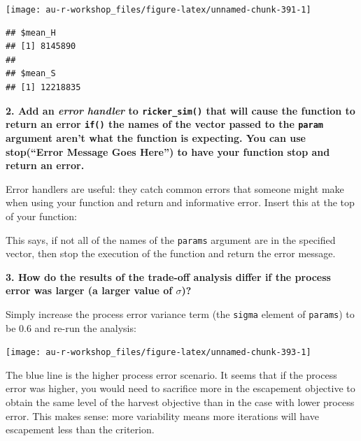\documentclass[]{book}
\newenvironment{Shaded}{\begin{snugshade}}{\end{snugshade}}
\newcommand{\ControlFlowTok}[1]{\textcolor[rgb]{0.13,0.29,0.53}{\textbf{#1}}}
\newcommand{\KeywordTok}[1]{\textcolor[rgb]{0.13,0.29,0.53}{\textbf{#1}}}
\newcommand{\NormalTok}[1]{#1}
\newcommand{\OperatorTok}[1]{\textcolor[rgb]{0.81,0.36,0.00}{\textbf{#1}}}
\newcommand{\StringTok}[1]{\textcolor[rgb]{0.31,0.60,0.02}{#1}}
\begin{document}
\begin{center}\texttt{[image: au-r-workshop\_files/figure-latex/unnamed-chunk-391-1]} \end{center}

\begin{verbatim}
## $mean_H
## [1] 8145890
## 
## $mean_S
## [1] 12218835
\end{verbatim}

\textbf{2. Add an \emph{error handler} to \texttt{ricker\_sim()} that will cause the function to return an error \texttt{if()} the names of the vector passed to the \texttt{param} argument aren't what the function is expecting. You can use stop(``Error Message Goes Here'') to have your function stop and return an error.}

Error handlers are useful: they catch common errors that someone might make when using your function and return and informative error. Insert this at the top of your function:

\begin{Shaded}
\end{Shaded}

This says, if not all of the names of the \texttt{params} argument are in the specified vector, then stop the execution of the function and return the error message.

\textbf{3. How do the results of the trade-off analysis differ if the process error was larger (a larger value of \(\sigma\))?}

Simply increase the process error variance term (the \texttt{sigma} element of \texttt{params}) to be 0.6 and re-run the analysis:

\begin{center}\texttt{[image: au-r-workshop\_files/figure-latex/unnamed-chunk-393-1]} \end{center}

The blue line is the higher process error scenario. It seems that if the process error was higher, you would need to sacrifice more in the escapement objective to obtain the same level of the harvest objective than in the case with lower process error. This makes sense: more variability means more iterations will have escapement less than the criterion.
\end{document}
